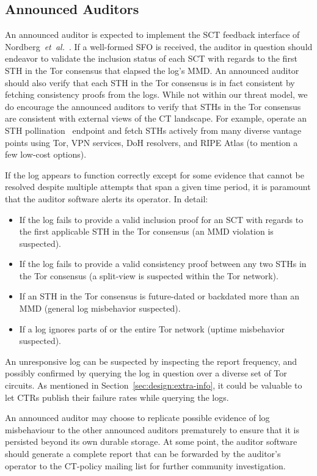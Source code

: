 \subsection{Announced Auditors} \label{sec:design:auditor}
An announced auditor is expected to implement the SCT feedback interface of
Nordberg~\emph{et~al.}~\cite{nordberg}.  If a well-formed SFO is received, the
auditor in question should endeavor to validate the inclusion status of each SCT
with regards to the first STH in the Tor consensus that elapsed the log's MMD.
An announced auditor should also verify that each STH in the Tor consensus is
in fact consistent by fetching consistency proofs from the logs.
While not within our threat model, we do encourage the announced auditors to
verify that STHs in the Tor consensus are consistent with external views of the
CT landscape.  For example, operate an STH pollination~\cite{nordberg} endpoint
and fetch STHs actively from many diverse vantage points using Tor, VPN
services, DoH resolvers, and RIPE Atlas (to mention a few low-cost options).

If the log appears to function correctly except for some evidence that cannot be
resolved despite multiple attempts that span a given time period, it is
paramount that the auditor software alerts its operator.  In detail:
\begin{itemize}
	\item If the log fails to provide a valid inclusion proof for an SCT with
		regards to the first applicable STH in the Tor consensus
		(an MMD violation is suspected).
	\item If the log fails to provide a valid consistency proof between any two
		STHs in the Tor consensus
		(a split-view is suspected within the Tor network).
	\item If an STH in the Tor consensus is future-dated or backdated more than
		an MMD (general log misbehavior suspected).
	\item If a log ignores parts of or the entire Tor network (uptime
		misbehavior suspected).
\end{itemize}

An unresponsive log can be suspected by inspecting the report frequency, and
possibly confirmed by querying the log in question over a diverse set of Tor
circuits.  As mentioned in Section~\ref{sec:design:extra-info}, it could be
valuable to let CTRs publish their failure rates while querying the logs.

An announced auditor may choose to replicate possible evidence of log
misbehaviour to the other announced auditors prematurely to ensure that
it is persisted beyond its own durable storage.  At some point, the auditor
software should generate a complete report that can be forwarded by the
auditor's operator to the CT-policy mailing list for further community
investigation.
